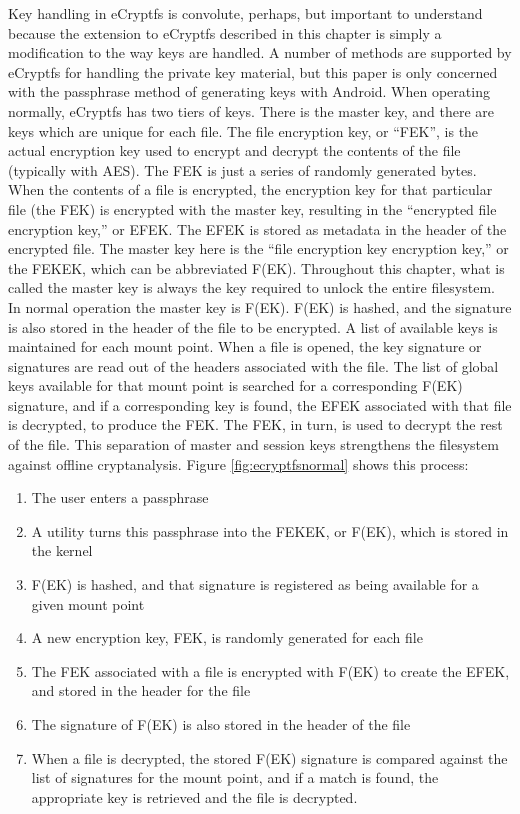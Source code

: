 Key handling in eCryptfs is convolute, perhaps, but important to understand because the extension to eCryptfs described in this
chapter is simply a modification to the way keys are handled. A number of methods are supported by eCryptfs for handling the private
key material, but this paper is only concerned with the passphrase method of generating keys with Android. When operating normally,
eCryptfs has two tiers of keys. There is the master key, and there are keys which are unique for each file. The file encryption key,
or ``FEK'', is the actual encryption key used to encrypt and decrypt the contents of the file (typically with AES). The FEK is just
a series of randomly generated bytes. When the contents of a file is encrypted, the encryption key for that particular file (the
FEK) is encrypted with the master key, resulting in the ``encrypted file encryption key,'' or EFEK.  The EFEK is stored as metadata
in the header of the encrypted file.  The master key here is the ``file encryption key encryption key,'' or the FEKEK, which can be
abbreviated F(EK). Throughout this chapter, what is called the master key is always the key required to unlock the
entire filesystem.  In normal operation the master key is F(EK). F(EK) is hashed, and the signature is
also stored in the header of the file to be encrypted. A list of available keys is maintained for each mount point. When a file is
opened, the key signature or signatures are read out of the headers associated with the file. The list of global keys available for
that mount point is searched for a corresponding F(EK) signature, and if a corresponding key is found, the EFEK
associated with that file is decrypted, to produce the FEK. The FEK, in turn, is used to decrypt the rest of the file.  This
separation of master and session keys strengthens the filesystem against offline cryptanalysis. Figure \ref{fig:ecryptfsnormal}
shows this process:
\begin{enumerate}
	\item{The user enters a passphrase}
	\item{A utility turns this passphrase into the FEKEK, or F(EK), which is stored in the kernel}
	\item{F(EK) is hashed, and that signature is registered as being available for a given mount point}
	\item{A new encryption key, FEK, is randomly generated for each file}
	\item{The FEK associated with a file is encrypted with F(EK) to create the EFEK, and stored in the header for the file}
	\item{The signature of F(EK) is also stored in the header of the file}
	\item{When a file is decrypted, the stored F(EK) signature is compared against the list of signatures for the mount point,
		and if a match is found, the appropriate key is retrieved and the file is decrypted.}
\end{enumerate}


